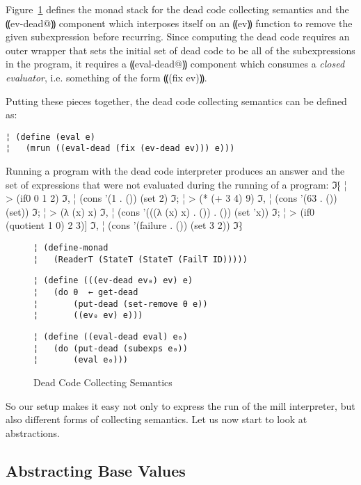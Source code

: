 Figure~\ref{f:dead} defines the monad stack for the dead code collecting
semantics and the ⸨ev-dead@⸩ component which interposes itself on an ⸨ev⸩
function to remove the given subexpression before recurring.  Since computing
the dead code requires an outer wrapper that sets the initial set of dead code
to be all of the subexpressions in the program, it requires a ⸨eval-dead@⸩
component which consumes a \emph{closed evaluator}, i.e. something of the form
⸨(fix ev)⸩.

Putting these pieces together, the dead code collecting semantics can be
defined as:
\begin{lstlisting}
¦ (define (eval e)
¦   (mrun ((eval-dead (fix (ev-dead ev))) e)))
\end{lstlisting}

Running a program with the dead code interpreter produces an answer and the set
of expressions that were not evaluated during the running of a program:
ℑ⁅
¦ > (if0 0 1 2)
ℑ,
¦ (cons '(1 . ()) (set 2)
ℑ;
¦ > (* (+ 3 4) 9)
ℑ,
¦ (cons '(63 . ()) (set))
ℑ;
¦ > (λ (x) x)
ℑ,
¦ (cons '(((λ (x) x) . ()) . ()) (set 'x))
ℑ;
¦ > (if0 (quotient 1 0) 2 3)]
ℑ,
¦ (cons '(failure . ()) (set 3 2))
ℑ⁆

\begin{figure}
\begin{lstlisting}
¦ (define-monad
¦   (ReaderT (StateT (StateT (FailT ID)))))
\end{lstlisting}
\figskip{}
\begin{lstlisting}
¦ (define (((ev-dead ev₀) ev) e)
¦   (do θ  ← get-dead       
¦       (put-dead (set-remove θ e))
¦       ((ev₀ ev) e)))
\end{lstlisting}
\figskip{}
\begin{lstlisting}
¦ (define ((eval-dead eval) e₀)
¦   (do (put-dead (subexps e₀))
¦       (eval e₀)))
\end{lstlisting}
\caption{Dead Code Collecting Semantics}
\label{f:dead}
\end{figure}

So our setup makes it easy not only to express the run of the mill interpreter,
but also different forms of collecting semantics. Let us now start to look at
abstractions.

\subsection{Abstracting Base Values}\label{s:base}

